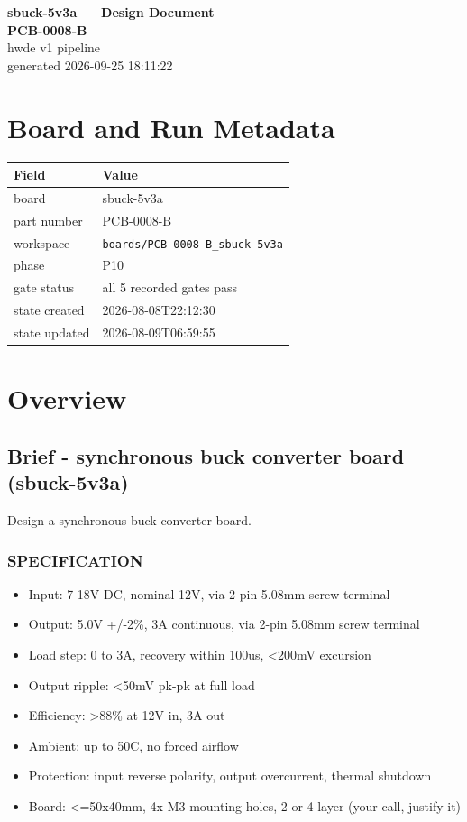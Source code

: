\documentclass[11pt,a4paper]{article}
\begin{document}
\sloppy
\begin{center}
{\LARGE\bfseries sbuck-5v3a --- Design Document}\\[6pt]
{\Large\bfseries PCB-0008-B}\\[6pt]
{\large hwde v1 pipeline}\\[2pt]
generated 2026-09-25 18:11:22
\end{center}
\tableofcontents

\section{Board and Run Metadata}
{\small
\begin{longtable}{lp{11cm}}
\toprule
\textbf{Field} & \textbf{Value} \\
\midrule
\endhead
board & sbuck-5v3a \\
part number & PCB-0008-B \\
workspace & \texttt{boards/PCB-0008-B\_sbuck-5v3a} \\
phase & P10 \\
gate status & all 5 recorded gates pass \\
state created & 2026-08-08T22:12:30 \\
state updated & 2026-08-09T06:59:55 \\
\bottomrule
\end{longtable}
}
\section{Overview}
\subsection*{Brief - synchronous buck converter board (sbuck-5v3a)}
Design a synchronous buck converter board.

\subsubsection*{SPECIFICATION}
\begin{itemize}
\item Input:        7-18V DC, nominal 12V, via 2-pin 5.08mm screw terminal
\item Output:       5.0V +/-2\%, 3A continuous, via 2-pin 5.08mm screw terminal
\item Load step:    0 to 3A, recovery within 100us, \textless{}200mV excursion
\item Output ripple: \textless{}50mV pk-pk at full load
\item Efficiency:   \textgreater{}88\% at 12V in, 3A out
\item Ambient:      up to 50C, no forced airflow
\item Protection:   input reverse polarity, output overcurrent, thermal shutdown
\item Board:        \textless{}=50x40mm, 4x M3 mounting holes, 2 or 4 layer (your call, justify it)
\end{itemize}
\end{document}
